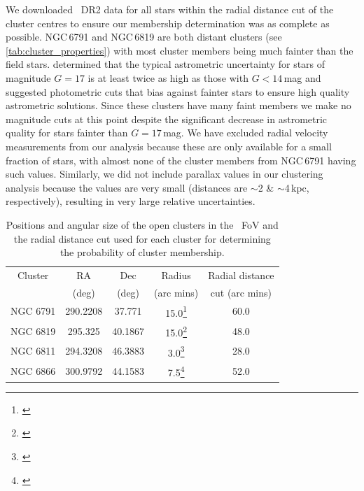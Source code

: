 We downloaded \Gaia~DR2 data for all stars within the radial distance cut of the cluster centres to ensure our membership determination was as complete as possible. 
NGC\,6791 and NGC\,6819 are both distant clusters (see \cref{tab:cluster_properties}) with most cluster members being much fainter than the field stars. \cite{lindegren_gaia_2018} determined that the typical astrometric uncertainty for stars of magnitude $G=17$ is at least twice as high as those with $G<14$\,mag and suggested photometric cuts that bias against fainter stars to ensure high quality astrometric solutions. Since these clusters have many faint members we make no magnitude cuts at this point despite the significant decrease in astrometric quality for stars fainter than $G=17$\,mag. We have excluded radial velocity measurements from our analysis because these are only available for a small fraction of stars, with almost none of the cluster members from NGC\,6791 having such values. Similarly, we did not include parallax values in our clustering analysis because the values are very small (distances are $\sim$2 \& $\sim$4\,kpc, respectively), resulting in very large relative uncertainties.

\begin{savenotes}
\begin{table}[!t]
    \centering
    \setlength\tabcolsep{10pt}
    \begin{tabular}{ccccc}
        \hline
        Cluster     & RA        & Dec       & Radius    & Radial distance \\
                    & (deg)     & (deg)     & (arc mins) & cut (arc mins) \\
        \hline
        \hline
        NGC 6791    & 290.2208  & 37.771    & 15.0\footnote[1]{\citep{platais_new_2011}} & 60.0\\
        NGC 6819    & 295.325   & 40.1867   & 15.0\footnote[2]{\cite{sagar_study_2002}} & 48.0\\
        NGC 6811    & 294.3208  & 46.3883   & 3.0\footnote[3]{\cite{sagar_study_2002}} & 28.0\\
        NGC 6866    & 300.9792  & 44.1583   & 7.5\footnote[4]{\cite{sagar_study_2002}} & 52.0\\
        \hline
    \end{tabular}
    \caption[Cluster positions and radial cuts]{Positions and angular size of the open clusters in the \Kepler~FoV and the radial distance cut used for each cluster for determining the probability of cluster membership.}
    \label{tab:cluster_selection}
\end{table}
\end{savenotes}

